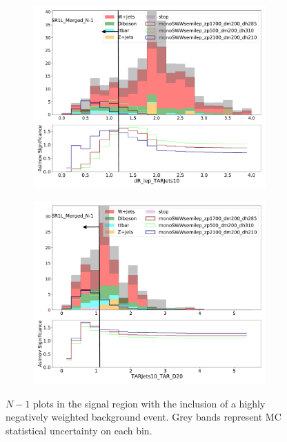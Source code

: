 \begin{figure}[htbp]
\begin{subfigure}{0.49\textwidth}
     \caption{\metsig}
     \end{subfigure}
     \begin{subfigure}{0.49\textwidth}
     \includegraphics[width = 0.98\textwidth]{Figures/4/N1n/dR_lep_TARJets10.pdf}
     \caption{\drTARl}
     \end{subfigure}
     \begin{subfigure}{0.49\textwidth}
     \includegraphics[width = 0.98\textwidth]{Figures/4/N1n/TARJets10_TAR_D20.pdf}
     \caption{\DtwoTAR}
     \end{subfigure}
     \caption{$N-1$ plots in the \merged signal region with the inclusion of a highly negatively weighted background event. Grey bands represent MC statistical uncertainty on each bin.}
     \label{fig:SRN1_backup}
  \end{figure}
